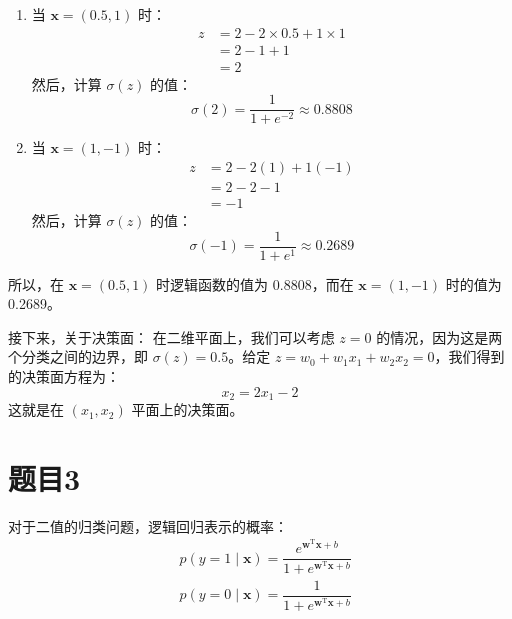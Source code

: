 \documentclass{article}
\begin{document}
\begin{enumerate}
    \item 当 $\mathbf{x} =(0.5,1)$ 时：
    \begin{align*}
    z &= 2 - 2\times 0.5 + 1\times 1 \\
    &= 2 - 1 + 1 \\
    &= 2
    \end{align*}
    然后，计算 $\sigma(z)$ 的值：
    \begin{equation}
    \sigma(2) = \dfrac{1}{1 + e^{-2}} \approx 0.8808
    \end{equation}

    \item 当 $\mathbf{x} =(1,-1)$ 时：
    \begin{align*}
    z &= 2 - 2(1) + 1(-1) \\
    &= 2 - 2 - 1 \\
    &= -1
    \end{align*}
    然后，计算 $\sigma(z)$ 的值：
    \begin{equation}
    \sigma(-1) = \dfrac{1}{1 + e^{1}} \approx 0.2689
    \end{equation}
\end{enumerate}

所以，在 $\mathbf{x} =(0.5,1)$ 时逻辑函数的值为 0.8808，而在 $\mathbf{x} =(1,-1)$ 时的值为 0.2689。

接下来，关于决策面：
在二维平面上，我们可以考虑 $z = 0$ 的情况，因为这是两个分类之间的边界，即 $\sigma(z) = 0.5$。给定 $z = w_0 + w_1x_1 + w_2x_2 = 0$，我们得到的决策面方程为：
\begin{equation}
x_2 = 2x_1 - 2
\end{equation}
这就是在 $(x_1,x_2)$ 平面上的决策面。


\section{题目3}

对于二值的归类问题，逻辑回归表示的概率：
\begin{equation}\label{eq2}
    \begin{aligned}
    & p(y=1 \mid \boldsymbol{x})=\dfrac{e^{\boldsymbol{w}^{\mathrm{T}} \boldsymbol{x}+b}}{1+e^{\boldsymbol{w}^{\mathrm{T}} \boldsymbol{x}+b}} \\
    & p(y=0 \mid \boldsymbol{x})=\dfrac{1}{1+e^{\boldsymbol{w}^{\mathrm{T}} \boldsymbol{x}+b}}
    \end{aligned}
\end{equation}
\end{document}
